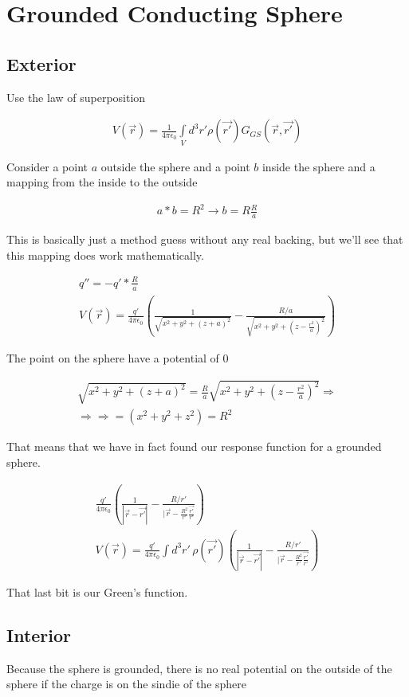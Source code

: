 \documentclass[fleqn]{report}
\newcommand{\equations} [1] {
\begin{gather*}
#1
\end{gather*}
}
\begin{document}
\section{Grounded Conducting Sphere}

\subsection{Exterior}
Use the law of superposition 
\equations{
    V(\vec r) 
    =
    \frac{1}{4 \pi \epsilon_0}
    \int\limits_V d^3 r' 
    \rho(\vec{r'}) G_{GS}(\vec r, \vec{r'})
}
Consider a point $a$ outside the sphere and a point $b$ inside the sphere 
and a mapping from the inside to the outside 
\equations{
    a * b  = R^2 
    \rightarrow 
    b = R \frac{R}{a}
}
This is basically just a method guess without any real backing, 
but we'll see that this mapping does work mathematically.
\equations{
    q'' = -q' * \frac{R}{a}
    \\
    V(\vec r)
    =
    \frac{q'}{4 \pi \epsilon_0}
    \left(
        \frac{1}{
            \sqrt{x^2 + y^2 + (z + a)^2}
        }
        -
        \frac{R/a}{
            \sqrt{x^2 + y^2 + (z - \frac{r^2}{a})^2}
        }
    \right)
}
The point on the sphere have a potential of $0$ 

\equations{
    \sqrt{x^2 + y^2 + (z + a)^2}
    =
    \frac{R}{a}
    \sqrt{x^2 + y^2 + (z - \frac{r^2}{a})^2}
    \Rightarrow 
    \\
    \Rightarrow 
    \Rightarrow 
    =
    (x^2 + y^2 + z^2) = R^2 
}

That means that we have in fact found our response function 
for a grounded sphere.

\equations{
    \frac{q'}{4 \pi \epsilon_0}
    \left(
        \frac{1}{|\vec r - \vec{r'}|}
        -
        \frac{R / r'}{|\vec r - \frac{R^2}{r'} \frac{\vec{r'}}{r'}}
    \right)
    \\
    V(\vec r)
    =
    \frac{q'}{4 \pi \epsilon_0}
    \int d^3 r' \, 
    \rho(\vec{r'})
    \left(
        \frac{1}{|\vec r - \vec{r'}|}
        -
        \frac{R / r'}{|\vec r - \frac{R^2}{r'} \frac{\vec{r'}}{r'}}
    \right)
}
That last bit is our Green's function. 

\subsection{Interior}
Because the sphere is grounded, there is no real 
potential on the outside of the sphere 
if the charge is on the sindie of the sphere 
\end{document}

